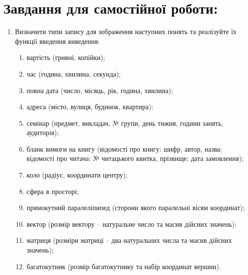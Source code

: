 \documentclass[a5paper,titlepage,openany,twoside,
]
{book_unv}%
\makeatletter
\newcommand{\xslalph}[1]{\expandafter\@xslalph\csname c@#1\endcsname}
\newcommand{\@xslalph}[1]{%
    \ifcase#1\or а\or б\or в\or г\or д\or e\or є\or ж\or з\or i%
    \or й\or к\or л\or м\or н\or о\or п\or р\or с\or т%
    \or у\or ф\or х\or ц\or ч\or ш\or ю\or я\or аа\or бб\or вв%
    \else\@ctrerr\fi%
}
\makeatother
\begin{document}
\section{Завдання для самостійної роботи:}

\begin{enumerate}
\def\labelenumi{\arabic{enumi})}
\setcounter{enumi}{5}
\item
 Визначити типи запису для зображення наступних понять та реалізуйте
їх функції введення виведення:
\begin{enumerate}[label=\xslalph*)]
\item вартість (гривні, копійки);
\item час (година, хвилина, секунда);
\item повна дата (число, місяць, рік, година, хвилина);
\item адреса (місто, вулиця, будинок, квартира);
\item семінар (предмет, викладач, № групи, день тижня, години занять, аудиторія);
\item бланк вимоги на книгу (відомості про книгу: шифр, автор, назва;
відомості про читача: № читацького квитка, прізвище; дата замовлення);
\item коло (радіус, координати центру);
\item сфера в просторі;
\item прямокутний паралеліпипед (сторони якого паралельні вісям координат);
\item вектор (розмір вектору -- натуральне число та масив дійсних значень);
\item матриця (розміри матриці -- два натуральних числа та масив дійсних значень);
\item багатокутник (розмір багатокутнику та набір координат вершин).


\end{enumerate}


\end{enumerate}
\end{document}
